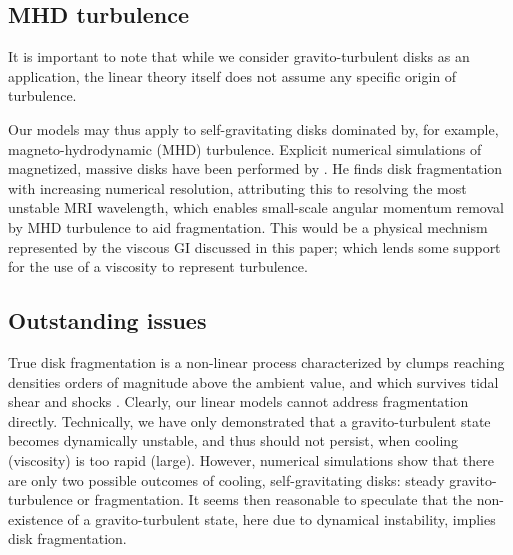 \subsection{MHD turbulence}\label{MHD}%
It is important to note that while we consider gravito-turbulent disks  
as an application, the linear theory itself does not assume any 
specific origin of turbulence. 

Our models may thus apply to self-gravitating disks dominated by, for
example, magneto-hydrodynamic (MHD) turbulence.   
Explicit numerical simulations of magnetized, massive disks have been performed 
by \cite{fromang05}. He finds disk fragmentation with increasing numerical
resolution, attributing this to resolving the most unstable MRI
wavelength, which enables small-scale angular momentum removal by MHD
turbulence to aid fragmentation. %
This would be a physical mechnism represented by the viscous GI
discussed in this paper; which lends some support for  
the use of a viscosity to represent turbulence.    


\subsection{Outstanding issues}
True disk fragmentation is a non-linear process characterized by clumps   
reaching densities orders of magnitude above the ambient value, and
which survives tidal shear and shocks \citep{paardekooper12,young16}.  
Clearly, our linear models cannot address fragmentation
directly. Technically, we have only demonstrated that a 
gravito-turbulent state becomes dynamically unstable, and thus should
not persist, when cooling (viscosity) is too rapid (large).  
However, numerical simulations show that there are only two
possible outcomes of cooling, self-gravitating disks: steady
gravito-turbulence or fragmentation. It seems then reasonable to 
speculate that the non-existence of a gravito-turbulent state, here due to
dynamical instability, implies disk fragmentation.  

